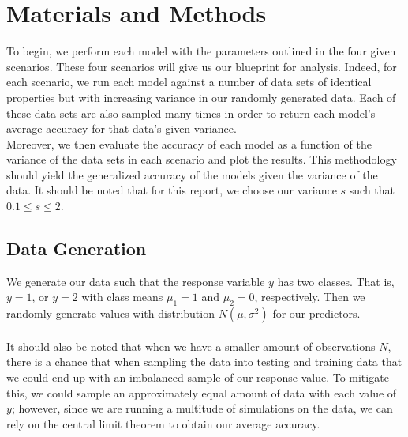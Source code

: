 \documentclass[11pt, oneside]{article}
\begin{document}
\pagebreak




\section*{Materials and Methods}
To begin, we perform each model with the parameters outlined in the four given scenarios. These four scenarios will give us our blueprint for analysis. Indeed, for each scenario, we run each model against a number of data sets of identical properties but with increasing variance in our randomly generated data. Each of these data sets are also sampled many times in order to return each model's average accuracy for that data's given variance.\\
Moreover, we then evaluate the accuracy of each model as a function of the variance of the data sets in each scenario and plot the results. This methodology should yield the generalized accuracy of the models given the variance of the data. It should be noted that for this report, we choose our variance $s$ such that $0.1\leq s\leq 2$.\\

 

\subsection*{Data Generation} 
We generate our data such that the response variable $y$ has two classes. That is, $y=1$, or $y=2$ with class means $\mu_1=1$ and $\mu_2=0$, respectively. Then we randomly generate values with distribution $N(\mu, \sigma^2)$ for our predictors.\\
\\
It should also be noted that when we have a smaller amount of observations $N$, there is a chance that when sampling the data into testing and training data that we could end up with an imbalanced sample of our response value. To mitigate this, we could sample an approximately equal amount of data with each value of $y$; however, since we are running a multitude of simulations on the data, we can rely on the central limit theorem to obtain our average accuracy.\\ 
\end{document}
